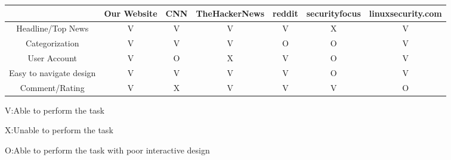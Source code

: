 \documentclass{article}
\begin{document}
\begin{table}[h!]
    \begin{tabular}{|c|c|c|c|c|c|c|}
    \hline
                   &  Our Website & CNN & TheHackerNews & reddit & securityfocus & linuxsecurity.com\\
    \hline
    Headline/Top News    &     V       &    V   &   V    &   V    &   X    &     V         \\
    \hline
    Categorization    &      V      &   V    &   V    &   O    &    O   &       V       \\
    \hline
    User Account    &     V      &   O    &    X   &   V    &    O   &      V       \\
    \hline
    Easy to navigate design    &      V      &   V    &   V    &  V     &   O    &    V          \\
    \hline
    Comment/Rating    &     V       &   X    &   V    &   V    &    V   &      O        \\ 
    \hline
    \end{tabular}
\end{table}
V:Able to perform the task\par
X:Unable to perform the task\par
O:Able to perform the task with poor interactive design\par
\end{document}
